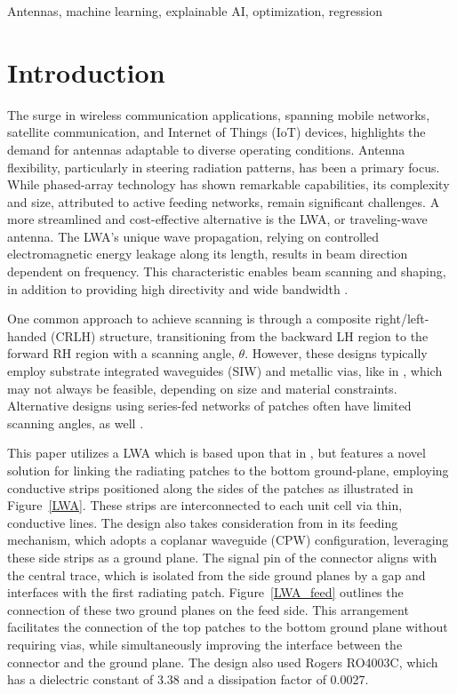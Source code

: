 \documentclass[conference]{IEEEtran}
\begin{document}
\begin{IEEEkeywords}
Antennas, machine learning, explainable AI, optimization, regression
\end{IEEEkeywords}


\section{Introduction}
The surge in wireless communication applications, spanning mobile networks, satellite communication, and Internet of Things (IoT) devices, highlights the demand for antennas adaptable to diverse operating conditions. Antenna flexibility, particularly in steering radiation patterns, has been a primary focus. While phased-array technology has shown remarkable capabilities, its complexity and size, attributed to active feeding networks, remain significant challenges. A more streamlined and cost-effective alternative is the LWA, or traveling-wave antenna. The LWA's unique wave propagation, relying on controlled electromagnetic energy leakage along its length, results in beam direction dependent on frequency. This characteristic enables beam scanning and shaping, in addition to providing high directivity and wide bandwidth \cite{LWA}. 

One common approach to achieve scanning is through a composite right/left-handed (CRLH) structure, transitioning from the backward LH region to the forward RH region with a scanning angle, \(\theta\). However, these designs typically employ substrate integrated waveguides (SIW) and metallic vias, like in \cite{crlh_siw_lwa,circular_lwa,SIW,CRLH_multivia}, which may not always be feasible, depending on size and material constraints. Alternative designs using series-fed networks of patches often have limited scanning angles, as well \cite{sfp_lwa}. 

This paper utilizes a LWA which is based upon that in \cite{CRLH_multivia}, but features a novel solution for linking the radiating patches to the bottom ground-plane, employing conductive strips positioned along the sides of the patches as illustrated in Figure~\ref{LWA}. These strips are interconnected to each unit cell via thin, conductive lines. The design also takes consideration from \cite{cpw_lwa} in its feeding mechanism, which adopts a coplanar waveguide (CPW) configuration, leveraging these side strips as a ground plane. The signal pin of the connector aligns with the central trace, which is isolated from the side ground planes by a gap and interfaces with the first radiating patch. Figure~\ref{LWA_feed} outlines the connection of these two ground planes on the feed side. This arrangement facilitates the connection of the top patches to the bottom ground plane without requiring vias, while simultaneously improving the interface between the connector and the ground plane. The design also used Rogers RO4003C, which has a dielectric constant of 3.38 and a dissipation factor of 0.0027. 
\end{document}
